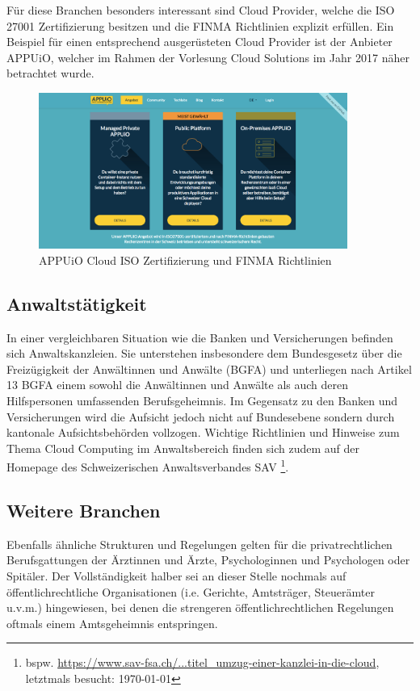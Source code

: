 \documentclass[a4paper,pointlessnumbers]{scrreprt}
\begin{document}
Für diese Branchen besonders interessant sind Cloud Provider, welche die ISO 27001 Zertifizierung besitzen und die FINMA Richtlinien explizit erfüllen. Ein Beispiel für einen entsprechend ausgerüsteten Cloud Provider ist der Anbieter APPUiO, welcher im Rahmen der Vorlesung Cloud Solutions im Jahr 2017 näher betrachtet wurde.

\begin{figure}[H]
\begin{center}
\includegraphics[width=0.9\textwidth]{images/appuio_iso.pdf}
\caption{APPUiO Cloud ISO Zertifizierung und FINMA Richtlinien}
\end{center}
\end{figure}

\subsection{Anwaltstätigkeit}
In einer vergleichbaren Situation wie die Banken und Versicherungen befinden sich Anwaltskanzleien. Sie unterstehen insbesondere dem Bundesgesetz über die Freizügigkeit der Anwältinnen und Anwälte (BGFA) und unterliegen nach Artikel 13 BGFA einem sowohl die Anwältinnen und Anwälte als auch deren Hilfspersonen umfassenden Berufsgeheimnis. Im Gegensatz zu den Banken und Versicherungen wird die Aufsicht jedoch nicht auf Bundesebene sondern durch kantonale Aufsichtsbehörden vollzogen. Wichtige Richtlinien und Hinweise zum Thema Cloud Computing im Anwaltsbereich finden sich zudem auf der Homepage des Schweizerischen Anwaltsverbandes SAV \footnote{bspw. \href{https://www.sav-fsa.ch/de/anwaltsrecht/literatur/allgemeines.htm\#titel\_umzug-einer-kanzlei-in-die-cloud}{https://www.sav-fsa.ch/...titel\_umzug-einer-kanzlei-in-die-cloud}, letztmals besucht: \today}.

\subsection{Weitere Branchen}
Ebenfalls ähnliche Strukturen und Regelungen gelten für die privatrechtlichen Berufsgattungen der Ärztinnen und Ärzte, Psychologinnen und Psychologen oder Spitäler. Der Vollständigkeit halber sei an dieser Stelle nochmals auf öffentlichrechtliche Organisationen (i.e. Gerichte, Amtsträger, Steuerämter u.v.m.) hingewiesen, bei denen die strengeren öffentlichrechtlichen Regelungen oftmals einem Amtsgeheimnis entspringen.
\end{document}
